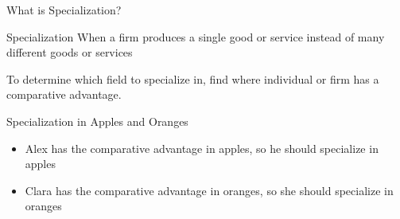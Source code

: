 \documentclass{beamer}
\begin{document}
\begin{frame}{What is Specialization?}
\begin{block}{Specialization}
When a firm produces a single good or service instead of many different goods or services
\end{block}

To determine which field to specialize in, find where individual or firm has a comparative advantage. 

\begin{exampleblock}{Specialization in Apples and Oranges}
\begin{itemize}
\item Alex has the comparative advantage in apples, so he should specialize in apples
\item Clara has the comparative advantage in oranges, so she should specialize in oranges
\end{itemize}
\end{exampleblock}

\end{frame}
\end{document}
